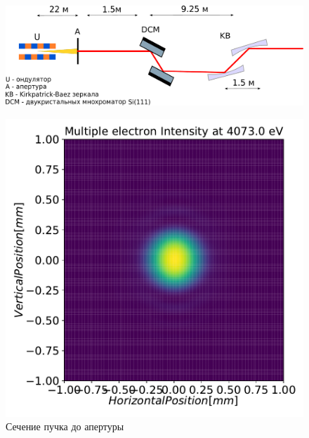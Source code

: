 \begin{figure}[h]
	\begin{minipage}{0.99\textwidth}
	\centering  
	\includegraphics[width=\textwidth]{pic/OptScheme_1-4.pdf}
	\label{fig:OptScheme_1-4}  
	\end{minipage}\hfill

	\begin{minipage}{0.3\textwidth}
		\centering
		\includegraphics[width=\textwidth]{pic/3_harm_before_optics_2d.pdf}
		\caption{Сечение пучка до апертуры}
		\label{fig:3_harm_before_optics_2d}
	\end{minipage}
	\begin{minipage}{0.3\textwidth}
		\centering

\end{minipage}
\end{figure}
